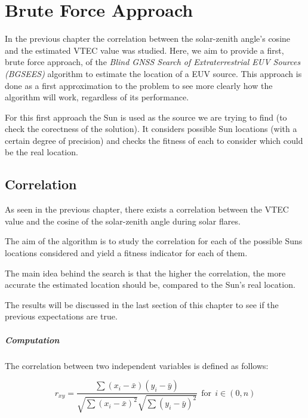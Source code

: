 \chapter{Brute Force Approach}

In the previous chapter the correlation between the solar-zenith angle's cosine and the estimated VTEC value was studied. Here, we aim to provide a first, brute force approach, of the \textit{Blind GNSS Search of Extraterrestrial EUV Sources (BGSEES)} algorithm to estimate the location of a EUV source. This approach is done as a first approximation to the problem to see more clearly how the algorithm will work, regardless of its performance.

For this first approach the Sun is used as the source we are trying to find (to check the corectness of the solution). It considers possible Sun locations (with a certain degree of precision) and checks the fitness of each to consider which could be the real location.

\section{Correlation}

As seen in the previous chapter, there exists a correlation between the VTEC value and the cosine of the solar-zenith angle during solar flares. 

The aim of the algorithm is to study the correlation for each of the possible Suns locations considered and yield a fitness indicator for each of them. 

The main idea behind the search is that the higher the correlation, the more accurate the estimated location should be, compared to the Sun's real location. 

The results will be discussed in the last section of this chapter to see if the previous expectations are true.

\paragraph{Computation}

The correlation between two independent variables is defined as follows:

\begin{equation} \label{eq:coefficient}
r_{xy} = \frac{\sum(x_{i} - \bar{x})(y_{i} - \bar{y})}
{\sqrt{\sum(x_{i} - \bar{x})^{2}}
	\sqrt{\sum(y_{i} - \bar{y})^{2}}} \ \ \text{for} \ \ i \in (0, n)
\end{equation} \\

